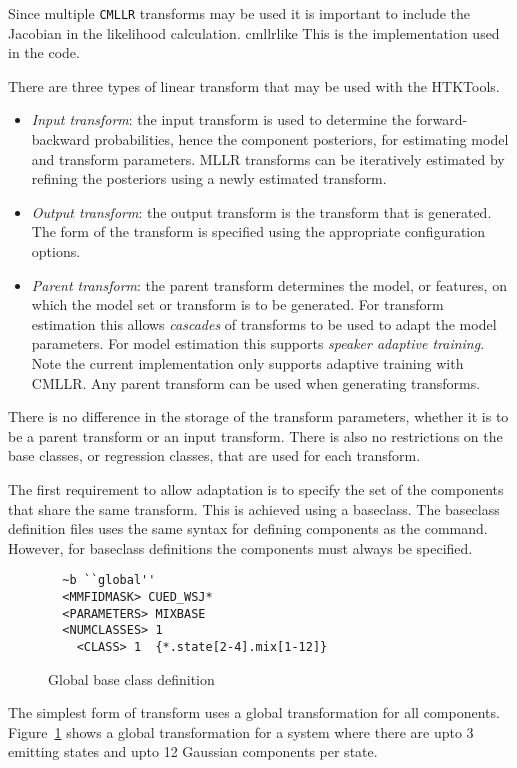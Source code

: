 Since multiple \texttt{CMLLR} transforms may be used it is important to 
include the Jacobian in the likelihood calculation. 
 {cmllrlike}
This is the implementation used in the code.


There are three types of linear transform that may be used with 
the HTKTools.
\begin{itemize}

\item {\it Input transform}: the input transform is used to determine
the forward-backward probabilities, hence the component posteriors,
for estimating model and transform parameters. MLLR transforms can be
iteratively estimated by refining the posteriors using a newly
estimated transform.

\item {\it Output transform}: the output transform is the transform
that is generated. The form of the transform is specified using the 
appropriate configuration options.

\item {\it Parent transform}: the parent transform determines the 
model, or features, on which the model set or transform is to be 
generated. For transform estimation this allows {\em cascades} of transforms
to be used to adapt the model parameters. For model estimation this 
supports {\em speaker adaptive training}. Note the current implementation 
only supports adaptive training with CMLLR. Any parent transform can be
used when generating transforms.
\end{itemize}

There is no difference in the storage of the transform parameters, whether it is to be a parent transform or an input transform. There is
also no restrictions on the base classes, or regression classes, that 
are used for each transform.

The first requirement to allow adaptation is to specify the set of
the components that share the same transform. This is achieved using a
baseclass.  The baseclass definition files uses the same syntax for
defining components as the  command. However, for
baseclass definitions the components must always be specified.

\begin{figure}[htbp]
\begin{verbatim}
  ~b ``global''
  <MMFIDMASK> CUED_WSJ* 
  <PARAMETERS> MIXBASE
  <NUMCLASSES> 1
    <CLASS> 1  {*.state[2-4].mix[1-12]}      
\end{verbatim}
\caption{Global base class definition}
\label{fig:globbase}
\end{figure}
The simplest form of transform uses a global transformation for all
components.  Figure~\ref{fig:globbase} shows a global transformation
for a system where there are upto 3 emitting states and upto 12
Gaussian components per state.

